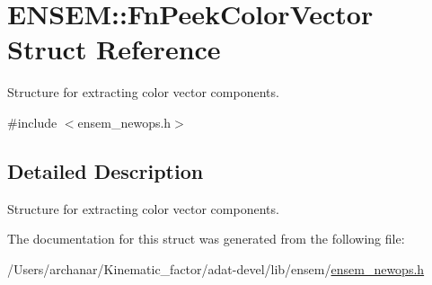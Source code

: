 \hypertarget{structENSEM_1_1FnPeekColorVector}{}\section{E\+N\+S\+EM\+:\+:Fn\+Peek\+Color\+Vector Struct Reference}
\label{structENSEM_1_1FnPeekColorVector}


Structure for extracting color vector components.  




{\ttfamily \#include $<$ensem\+\_\+newops.\+h$>$}



\subsection{Detailed Description}
Structure for extracting color vector components. 

The documentation for this struct was generated from the following file\+:\begin{DoxyCompactItemize}
\item 
/\+Users/archanar/\+Kinematic\+\_\+factor/adat-\/devel/lib/ensem/\mbox{\hyperlink{adat-devel_2lib_2ensem_2ensem__newops_8h}{ensem\+\_\+newops.\+h}}\end{DoxyCompactItemize}
